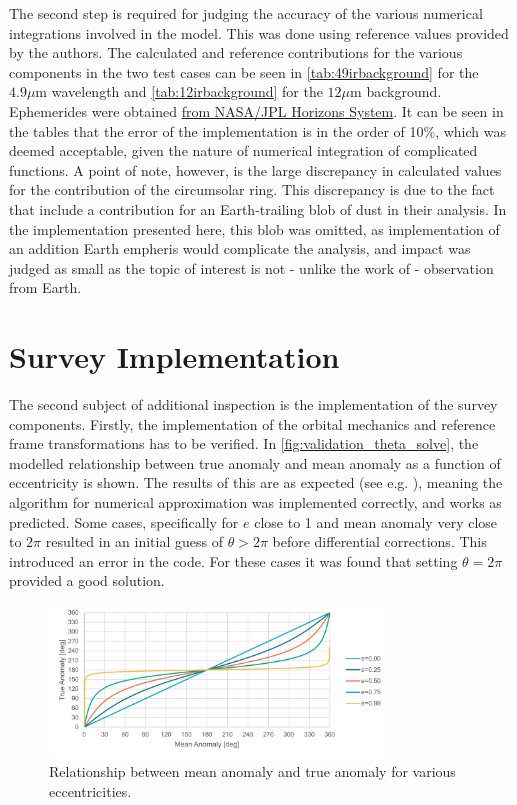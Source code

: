 The second step is required for judging the accuracy of the various numerical integrations involved in the model. This was done using reference values provided by the authors. The calculated and reference contributions for the various components in the two test cases can be seen in \autoref{tab:49irbackground} for the $4.9 \mu\mathrm{m}$ wavelength and \autoref{tab:12irbackground} for the $12 \mu\mathrm{m}$ background. Ephemerides were obtained \href{https://ssd.jpl.nasa.gov/horizons/}{from NASA/JPL Horizons System}. It can be seen in the tables that the error of the implementation is in the order of 10\%, which was deemed acceptable, given the nature of numerical integration of complicated functions. A point of note, however, is the large discrepancy in calculated values for the contribution of the circumsolar ring. This discrepancy is due to the fact that \cite{IRDust} include a contribution for an Earth-trailing blob of dust in their analysis. In the implementation presented here, this blob was omitted, as implementation of an addition Earth empheris would complicate the analysis, and impact was judged as small as the topic of interest is not - unlike the work of \cite{IRDust} - observation from Earth.

\section{Survey Implementation}
\label{sec:vvsurvey}
The second subject of additional inspection is the implementation of the survey components. Firstly, the implementation of the orbital mechanics and reference frame transformations has to be verified. In \autoref{fig:validation_theta_solve}, the modelled relationship between true anomaly and mean anomaly as a function of eccentricity is shown. The results of this are as expected (see e.g. \cite{Curtis}), meaning the algorithm for numerical approximation was implemented correctly, and works as predicted. Some cases, specifically for $e$ close to 1 and mean anomaly very close to $2\pi$ resulted in an initial guess of $\theta > 2\pi$ before differential corrections. This introduced an error in the code. For these cases it was found that setting $\theta = 2\pi$ provided a good solution. \\

\begin{figure}[htbp]
 \centering
 \includegraphics[width=0.8\textwidth]{img/validation_theta_solve.pdf}
 \caption{Relationship between mean anomaly and true anomaly for various eccentricities.}
 \label{fig:validation_theta_solve}
\end{figure}

